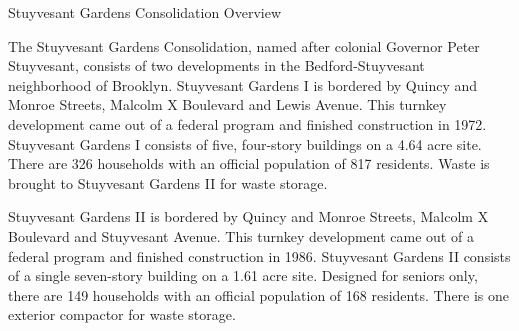 Stuyvesant Gardens Consolidation Overview

The Stuyvesant Gardens Consolidation, named after colonial Governor Peter Stuyvesant, consists of two developments in the Bedford-Stuyvesant neighborhood of Brooklyn. Stuyvesant Gardens I is bordered by Quincy and Monroe Streets, Malcolm X Boulevard and Lewis Avenue. This turnkey development came out of a federal program and finished construction in 1972. Stuyvesant Gardens I consists of five, four-story buildings on a 4.64 acre site. There are 326 households with an official population of 817 residents. Waste is brought to Stuyvesant Gardens II for waste storage.

Stuyvesant Gardens II is bordered by Quincy and Monroe Streets, Malcolm X Boulevard and Stuyvesant Avenue. This turnkey development came out of a federal program and finished construction in 1986. Stuyvesant Gardens II consists of a single seven-story building on a 1.61 acre site. Designed for seniors only, there are 149 households with an official population of 168 residents. There is one exterior compactor for waste storage.